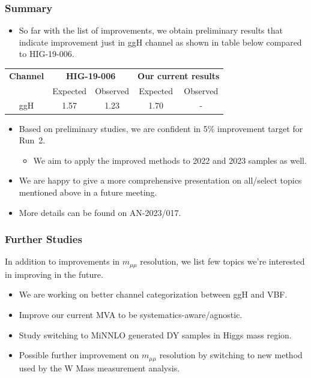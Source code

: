 \documentclass[dvipsnames,aspectratio=169]{beamer}
\begin{document}
\begin{frame}
    \frametitle{Summary}
\begin{itemize}
\item So far with the list of improvements, we obtain preliminary results that indicate improvement just in ggH channel as shown in table below compared to HIG-19-006.
\end{itemize}
\begin{table}[h!]
\centering
\begin{tabular}{|c|cc|cc|}
\hline
\textbf{Channel} & \multicolumn{2}{c|}{\textbf{HIG-19-006}} & \multicolumn{2}{c|}{\textbf{Our current results}} \\
 & Expected & Observed & Expected & Observed \\
\hline
ggH & 1.57 & 1.23 & 1.70 & - \\
\hline
\end{tabular}
\label{tab:ggh_comparison}
\end{table}
    \begin{itemize}
    \item Based on preliminary studies, we are confident in 5\% improvement target for Run~2.
    
    \begin{itemize}
    \item We aim to apply the improved methods to 2022 and 2023 samples as well.
    \end{itemize}
    \item We are happy to give a more comprehensive presentation on all/select topics mentioned above in a future meeting.
    \item More details can be found on AN-2023/017.
    \end{itemize}
\end{frame}


\begin{frame}
    \frametitle{Further Studies}
    In addition to improvements in $m_{\mu\mu}$ resolution, we list few topics we're interested in improving in the future.
    \begin{itemize}
    \item We are working on better channel categorization between ggH and VBF.
    \item Improve our current MVA to be systematics-aware/agnostic.
    \item Study switching to MiNNLO generated DY samples in Higgs mass region.
    \item Possible further improvement on $m_{\mu\mu}$ resolution by switching to new method used by the W Mass measurement analysis.
    \end{itemize}
\end{frame}
\end{document}

